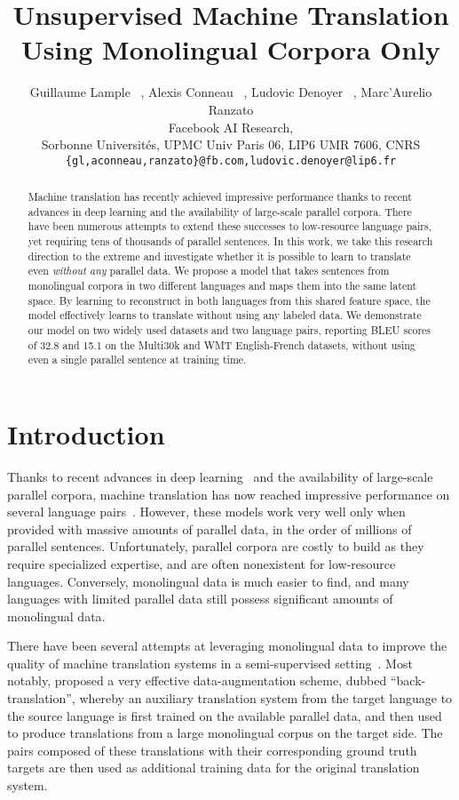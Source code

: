 \documentclass{article} \usepackage{iclr2018_conference,times}
\title{Unsupervised Machine Translation \\ Using Monolingual Corpora Only}
\author{Guillaume Lample  ~, Alexis Conneau ~, Ludovic Denoyer ~, Marc'Aurelio Ranzato \\
	 Facebook AI Research,\\
	 Sorbonne Universit\'es, UPMC Univ Paris 06, LIP6 UMR 7606, CNRS \\
	\texttt{\{gl,aconneau,ranzato\}@fb.com,ludovic.denoyer@lip6.fr} \\
}
\begin{document}
\maketitle

 \begin{abstract}
Machine translation has recently achieved impressive performance thanks to recent advances in deep learning and the availability of large-scale parallel corpora. There have been numerous attempts to extend these successes to low-resource language pairs, yet requiring tens of thousands of parallel sentences. In this work, we take this research direction to the extreme and investigate whether it is possible to learn to translate even \textit{without any} parallel data. We propose a model that takes sentences from monolingual corpora in two different languages and maps them into the same latent space. By learning to reconstruct in both languages from this shared feature space, the model effectively learns to translate without using any labeled data. We demonstrate our model on two widely used datasets and two language pairs, reporting BLEU scores of 32.8 and 15.1 on the Multi30k and WMT English-French datasets, without using even a single parallel sentence at training time.
\end{abstract}
  
\section{Introduction}
\label{sec:introduction}
Thanks to recent advances in deep learning~\citep{sutskever2014sequence, attentionNMT} and the availability
of large-scale parallel corpora, machine translation has now reached impressive performance on several language pairs~\citep{wu2016google}. However, these models work very well only when provided with massive amounts of parallel data, in the order of millions of parallel sentences. Unfortunately, parallel corpora are costly to build as they require specialized expertise, and are often nonexistent for low-resource languages. Conversely, monolingual data is much easier to find, and many languages with limited parallel data still possess significant amounts of monolingual data.

There have been several attempts at leveraging monolingual data to improve the quality of machine translation systems in a semi-supervised setting~\citep{marcu04,irvine13,irvine15,zheng17}. Most notably,  \citet{sennrich2015improving} proposed a very effective data-augmentation scheme, dubbed ``back-translation'',
whereby an auxiliary translation system from the target language to the source language is first trained on the available parallel data, and then used to produce translations from a large monolingual corpus on the target side. The pairs composed of these translations with their corresponding ground truth targets are then used as additional training data for the original translation system. 
\end{document}
